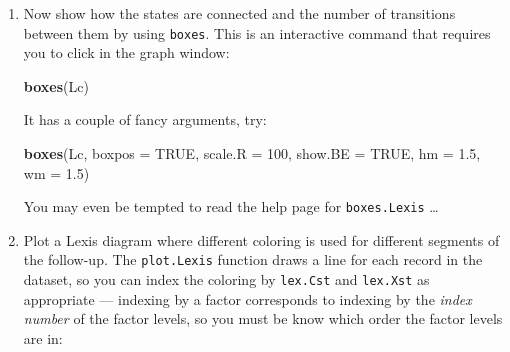 \documentclass[
]{book}
\newenvironment{Shaded}{\begin{snugshade}}{\end{snugshade}}
\newcommand{\AttributeTok}[1]{\textcolor[rgb]{0.13,0.29,0.53}{#1}}
\newcommand{\ConstantTok}[1]{\textcolor[rgb]{0.56,0.35,0.01}{#1}}
\newcommand{\DecValTok}[1]{\textcolor[rgb]{0.00,0.00,0.81}{#1}}
\newcommand{\FloatTok}[1]{\textcolor[rgb]{0.00,0.00,0.81}{#1}}
\newcommand{\FunctionTok}[1]{\textcolor[rgb]{0.13,0.29,0.53}{\textbf{#1}}}
\newcommand{\NormalTok}[1]{#1}
\begin{document}
\begin{enumerate}
\begin{Shaded}
\begin{Highlighting}[]

\NormalTok{Transitions:}
\NormalTok{     To}
\NormalTok{From  NRA Rem ESRD ESRD(Rem) Records: Events: Risk time: Persons:}
\NormalTok{  NRA  24  29   69         0      122      98        825      122}
\NormalTok{  Rem   0  24    0         8       32       8        260       32}
\NormalTok{  Sum  24  53   69         8      154     106       1085      125}
\end{Highlighting}
\end{Shaded}

  List the records from a few select persons (choose values for
  \texttt{lex.id}, using for example \texttt{subset(Lc,\ lex.id\ \%in\%\ c(5,7,9))}).
\item
  Now show how the states are connected and the number of transitions
  between them by using \texttt{boxes}. This is an interactive command
  that requires you to click in the graph window:

\begin{Shaded}
\begin{Highlighting}[]
\FunctionTok{boxes}\NormalTok{(Lc)}
\end{Highlighting}
\end{Shaded}

  It has a couple of fancy arguments, try:

\begin{Shaded}
\begin{Highlighting}[]
\FunctionTok{boxes}\NormalTok{(Lc, }\AttributeTok{boxpos =} \ConstantTok{TRUE}\NormalTok{, }\AttributeTok{scale.R =} \DecValTok{100}\NormalTok{, }\AttributeTok{show.BE =} \ConstantTok{TRUE}\NormalTok{, }\AttributeTok{hm =} \FloatTok{1.5}\NormalTok{, }\AttributeTok{wm =} \FloatTok{1.5}\NormalTok{)}
\end{Highlighting}
\end{Shaded}

  You may even be tempted to read the help page for
  \texttt{boxes.Lexis} \ldots{}
\item
  Plot a Lexis diagram where different coloring is
  used for different segments of the follow-up. The
  \texttt{plot.Lexis} function draws a line for each record in the
  dataset, so you can index the coloring by \texttt{lex.Cst} and
  \texttt{lex.Xst} as appropriate --- indexing by a factor corresponds
  to indexing by the \emph{index number} of the factor levels, so you
  must be know which order the factor levels are in:


\end{enumerate}
\end{document}
